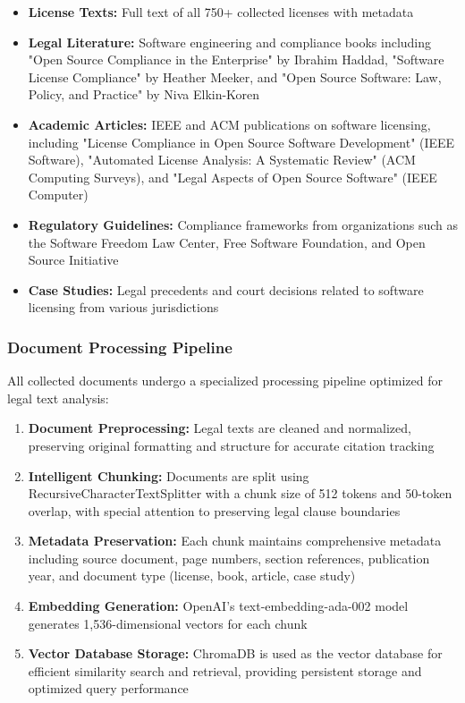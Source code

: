 \begin{itemize}
    \item \textbf{License Texts:} Full text of all 750+ collected licenses with metadata
    \item \textbf{Legal Literature:} Software engineering and compliance books including "Open Source Compliance in the Enterprise" by Ibrahim Haddad, "Software License Compliance" by Heather Meeker, and "Open Source Software: Law, Policy, and Practice" by Niva Elkin-Koren
    \item \textbf{Academic Articles:} IEEE and ACM publications on software licensing, including "License Compliance in Open Source Software Development" (IEEE Software), "Automated License Analysis: A Systematic Review" (ACM Computing Surveys), and "Legal Aspects of Open Source Software" (IEEE Computer)
    \item \textbf{Regulatory Guidelines:} Compliance frameworks from organizations such as the Software Freedom Law Center, Free Software Foundation, and Open Source Initiative
    \item \textbf{Case Studies:} Legal precedents and court decisions related to software licensing from various jurisdictions
\end{itemize}

\subsubsection{Document Processing Pipeline}
All collected documents undergo a specialized processing pipeline optimized for legal text analysis:

\begin{enumerate}
    \item \textbf{Document Preprocessing:} Legal texts are cleaned and normalized, preserving original formatting and structure for accurate citation tracking
    \item \textbf{Intelligent Chunking:} Documents are split using RecursiveCharacterTextSplitter with a chunk size of 512 tokens and 50-token overlap, with special attention to preserving legal clause boundaries
    \item \textbf{Metadata Preservation:} Each chunk maintains comprehensive metadata including source document, page numbers, section references, publication year, and document type (license, book, article, case study)
    \item \textbf{Embedding Generation:} OpenAI's text-embedding-ada-002 model generates 1,536-dimensional vectors for each chunk
    \item \textbf{Vector Database Storage:} ChromaDB is used as the vector database for efficient similarity search and retrieval, providing persistent storage and optimized query performance
\end{enumerate}

